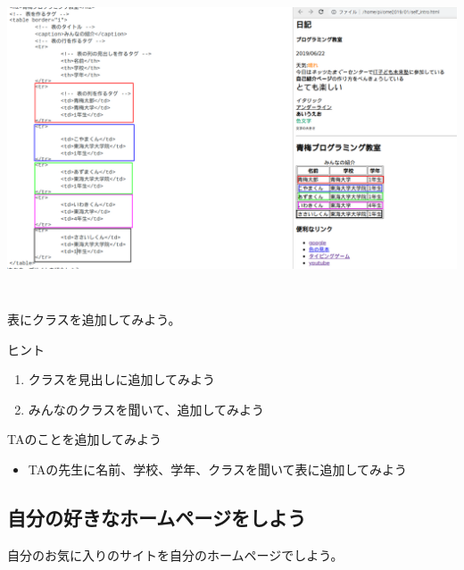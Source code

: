 \documentclass[a4paper,12pt]{jarticle}
\begin{document}
\bigskip


\bigskip


\bigskip
\includegraphics[width=15.861cm,height=9.245cm]{textbook-img192.png}




\bigskip

\bigskip

\bigskip

\theQuestion

表にクラスを追加してみよう。

ヒント

\begin{enumerate}
  \item クラスを見出しに追加してみよう
  \item
        みんなのクラスを聞いて、追加してみよう
\end{enumerate}
\theQuestion

TAのことを追加してみよう

\begin{itemize}
  \item
        TAの先生に名前、学校、学年、クラスを聞いて表に追加してみよう
\end{itemize}

\bigskip

\clearpage

\subsection{\theExercise 自分の好きなホームページをしよう}
自分のお気に入りのサイトを自分のホームページでしよう。
\end{document}
